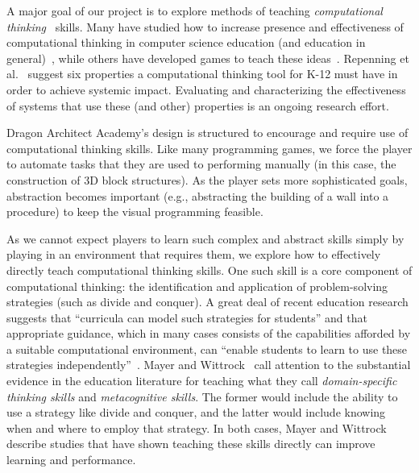 \documentclass{sig-alternate}
\newcommand{\gametitle}{{\color{RoyalPurple} Dragon Architect Academy}}
\begin{document}
A major goal of our project is to explore methods of teaching \emph{computational thinking}~\cite{wing2008computational} skills.
Many have studied how to increase presence and effectiveness of computational thinking in computer science education (and education in general)~\cite{barr2011bringing, lye2014review},
while others have developed games to teach these ideas~\cite{weintrop2013robobuilder, kazimoglu2012serious}. 
Repenning et al.~\cite{repenning2010scalable} suggest six properties a computational thinking tool for K-12 must have in order to achieve systemic impact. 
Evaluating and characterizing the effectiveness of systems that use these (and other) properties is an ongoing research effort.

\gametitle{}'s design is structured to encourage and require use of computational thinking skills.
Like many programming games, we force the player to automate tasks that they are used to performing manually (in this case, the construction of 3D block structures).
As the player sets more sophisticated goals, abstraction becomes important (e.g., abstracting the building of a wall into a procedure) to keep the visual programming feasible. 

As we cannot expect players to learn such complex and abstract skills simply by playing in an environment that requires them, we explore how to effectively directly teach computational thinking skills.
One such skill is a core component of computational thinking: the identification and application of problem-solving strategies (such as divide and conquer). 
A great deal of recent education research suggests that ``curricula can model such strategies for students'' and that appropriate guidance, which in many cases consists of the capabilities afforded by a suitable computational environment, can ``enable students to learn to use these strategies independently''~\cite{report2010computational}. 
Mayer and Wittrock~\cite{mayer1996handbook} call attention to the substantial evidence in the education literature for teaching what they call \emph{domain-specific thinking skills} and \emph{metacognitive skills}. 
The former would include the ability to use a strategy like divide and conquer, and the latter would include knowing when and where to employ that strategy. 
In both cases, Mayer and Wittrock describe studies that have shown teaching these skills directly can improve learning and performance. 
\end{document}
